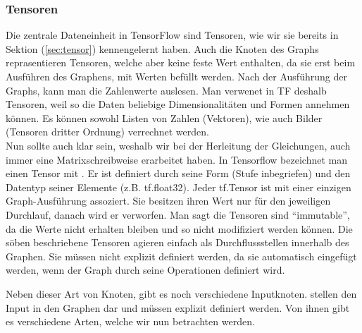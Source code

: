 \subsubsection{Tensoren}
Die zentrale Dateneinheit in TensorFlow sind Tensoren, wie wir sie bereits in
Sektion (\ref{sec:tensor}) kennengelernt haben.
Auch die Knoten des Graphs reprasentieren Tensoren, welche aber keine feste Wert
enthalten, da sie erst beim Ausführen des Graphens, mit Werten befüllt werden.
Nach der Ausführung der Graphs, kann man die Zahlenwerte auslesen.
\para{}
Man verwenet in TF deshalb Tensoren, weil so die Daten beliebige Dimensionalitäten
und Formen annehmen können. Es können sowohl Listen von Zahlen (Vektoren),
wie auch Bilder (Tensoren dritter Ordnung) verrechnet werden. \\
Nun sollte auch klar sein, weshalb wir bei der Herleitung der Gleichungen, auch
immer eine Matrixschreibweise erarbeitet haben.
\para{}
In Tensorflow bezeichnet man einen Tensor mit .
Er ist definiert durch seine Form (Stufe inbegriefen) und den Datentyp seiner
Elemente (z.B. tf.float32).
\para{}
Jeder tf.Tensor ist mit einer einzigen Graph-Ausführung assoziert. Sie
besitzen ihren Wert nur für den jeweiligen Durchlauf, danach wird er verworfen.
Man sagt die Tensoren sind ``immutable'', da die Werte nicht erhalten bleiben
und so nicht modifiziert werden können.
\para{}
Die söben beschriebene Tensoren agieren einfach als Durchflussstellen innerhalb
des Graphen. Sie müssen nicht explizit definiert werden, da sie automatisch
eingefügt werden, wenn der Graph durch seine Operationen definiert wird.
\para{}

Neben dieser Art von Knoten, gibt es noch verschiedene Inputknoten.
stellen den Input in den Graphen dar und müssen explizit definiert werden. Von ihnen gibt es verschiedene Arten,
welche wir nun betrachten werden.

